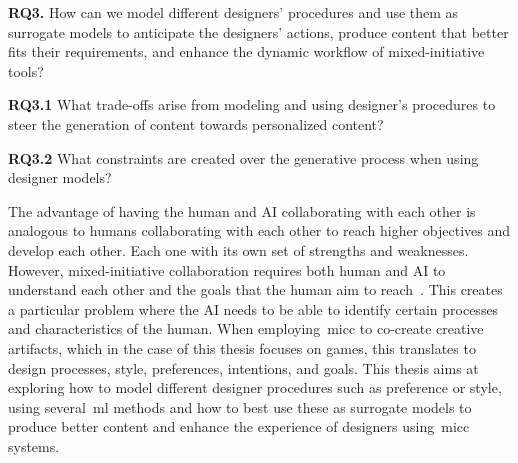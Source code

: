 
\begin{retQuestion}{}
   \textbf{RQ3.} How can we model different designers' procedures and use them as surrogate models to anticipate the designers' actions, produce content that better fits their requirements, and enhance the dynamic workflow of mixed-initiative tools? 
   
    \begin{retQuestion}{}
        \textbf{RQ3.1} What trade-offs arise from modeling and using designer's procedures to steer the generation of content towards personalized content?
    \end{retQuestion}
   
   \begin{retQuestion}{}
        \textbf{RQ3.2} What constraints are created over the generative process when using designer models?
    \end{retQuestion}
   
\end{retQuestion}

The advantage of having the human and AI collaborating with each other is analogous to humans collaborating with each other to reach higher objectives and develop each other. Each one with its own set of strengths and weaknesses. However, mixed-initiative collaboration requires both human and AI to understand each other and the goals that the human aim to reach~\cite{Horvitz99-mixedInit,novick97-mixedInit}. This creates a particular problem where the AI needs to be able to identify certain processes and characteristics of the human. When employing~\acrshort{micc} to co-create creative artifacts, which in the case of this thesis focuses on games, this translates to design processes, style, preferences, intentions, and goals. This thesis aims at exploring how to model different designer procedures such as preference or style, using several~\acrlong{ml} methods and how to best use these as surrogate models to produce better content and enhance the experience of designers using~\acrshort{micc} systems.


